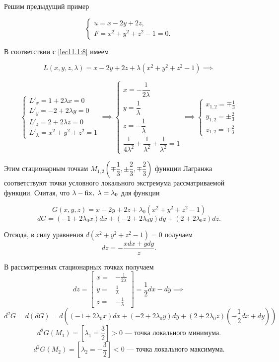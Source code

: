 \documentclass[../../main.tex]{subfiles}
\begin{document}
	\begin{exmp}
	
	Решим предыдущий пример 
	
	\[\begin{cases}
	u = x - 2y + 2z, \\
	F = x^2 + y^2 + z^2 - 1 = 0.
    \end{cases}\]
	
	В соответствии с \eqref{lec11.1:8} имеем 
	
	\[L \left( x, y, z, \lambda \right) = x - 2y + 2z + \lambda \left( x^2 + y^2 
	+ z^2 - 1 \right) \implies\]
	
	\[
	\begin{cases}
	L'_x = 1 + 2 \lambda x = 0 \\
	L'_y = -2 + 2 \lambda y = 0 \\
	L'_z = 2 + 2 \lambda z = 0 \\
	L'_\lambda = x^2 + y^2 + z^2 = 1
	\end{cases} \implies
	\begin{cases}
	x = -\dfrac{1}{2\lambda} \\
	y = \dfrac{1}{\lambda} \\
	z = -\dfrac{1}{\lambda} \\
	\dfrac{1}{4\lambda^2} + \dfrac{1}{\lambda^2} + \dfrac{1}{\lambda^2} = 1
	\end{cases} \implies
	\begin{cases}
	x_{1, 2} = \mp \frac{1}{3} \\
	y_{1, 2} = \pm \frac{2}{3} \\
	z_{1, 2} = \mp \frac{2}{3} 
	\end{cases}
	\]
	
	Этим стационарным точкам $M_{1, 2} \left( \mp \dfrac{1}{3}, 
	\pm \dfrac{2}{3}, \mp \dfrac{2}{3} \right) $ функции Лагранжа 
	соответствуют точки условного локального
	экстремума рассматриваемой функции. Считая, что $\lambda - \operatorname{fix},\  
	\lambda = \lambda_0$ для функции
	
	\[G\left( x, y, z \right) = x - 2y + 2z + 
	\lambda_0\left( x^2 + y^2 + z^2 - 1 \right)\]
	\[
	dG = \left( -1 + 2 \lambda_0 x \right)dx + \left( -2 + 2\lambda_0 y\right)dy 
	+ \left( 2 + 2 \lambda_0 z\right) dz.\]
	
	Отсюда, в силу уравнения $d\left( x^2 + y^2 + z^2 - 1 
	\right) = 0$ получаем
	\[ dz = - \frac{xdx + ydy}{z}.\]
	
	В рассмотренных стационарных точках получаем
	\[ dz = \left[
	\begin{array}{rl}
	x =& -\frac{1}{2\lambda} \\
	y =& \frac{1}{\lambda} \\
	z =& -\frac{1}{\lambda}
	\end{array}
	\right] = \frac{1}{2}dx - dy \implies\] 
	\[d^2G = d\left(dG\right) = 
	d\left(\left(-1 + 2\lambda_0x\right)dx + \left(-2 
	+ 2\lambda_0y\right)dy 
	+ \left(2 + 2\lambda_0z\right)\left(-\frac{1}{2}dx + dy\right)\right) \]
	\[d^2G(M_1) = \left[\lambda_1 = \frac{3}{2}\right] > 0
	\text{~--- точка локального минимума.}\]
	\[d^2G(M_2) = \left[\lambda_2 = -\frac{3}{2}\right] < 0
	\text{~--- точка локального максимума.}\]
	

\end{exmp}
\end{document}
